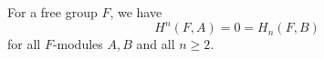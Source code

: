 For a free group $F$, we have
$$H^n(F, A) = 0 = H_n(F, B)$$
for all $F$-modules $A, B$ and all $n \geq 2$.
